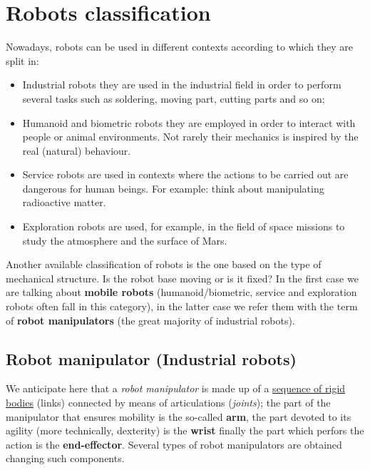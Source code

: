 \section{Robots classification}
Nowadays, robots can be used in different contexts according to which they are split in: 
\begin{itemize}
    \itemsep-0.2em
    \item \textsf{Industrial robots} they are used in the industrial field in order to perform several tasks such as soldering, moving part, cutting parts and so on; 
    \item \textsf{Humanoid and biometric robots} they are employed in order to interact with people or animal environments. Not rarely their mechanics is inspired by the real (natural) behaviour. 
    \item \textsf{Service robots} are used in contexts where the actions to be carried out are dangerous for human beings. For example: think about manipulating radioactive matter.
    \item \textsf{Exploration robots} are used, for example, in the field of space missions to study the atmosphere and the surface of Mars.
\end{itemize}

Another available classification of robots is the one based on the type of mechanical structure. Is the robot base moving or is it fixed? In the first case we are talking about \textbf{mobile robots} (humanoid/biometric, service and exploration robots often fall in this category), in the latter case we refer them with the term of \textbf{robot manipulators} (the great majority of industrial robots).

\subsection{Robot manipulator (Industrial robots)}
We anticipate here that a \textit{robot manipulator} is made up of a \underline{sequence of rigid bodies} (links) connected by means of articulations (\textit{joints}); the part of the manipulator that ensures mobility is the so-called \textbf{arm}, the part devoted to its agility (more technically, dexterity) is the \textbf{wrist} finally the part which perfors the action  is the \textbf{end-effector}. Several types of robot manipulators are obtained changing such components.

